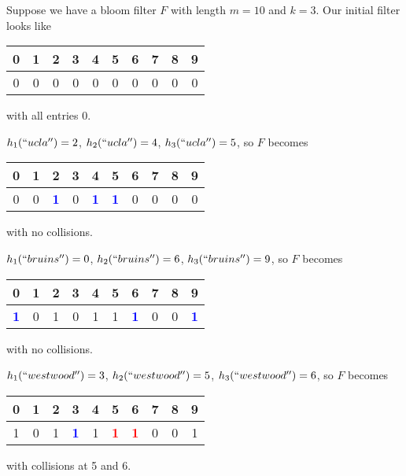 \documentclass{report}
\newenvironment{example}{\begin{tcolorbox}[title={Example},colback=green!5!white,colframe=black!75!green]}{\end{tcolorbox}}
\renewcommand{\bf}[1]{\textbf{{#1}}}
\begin{document}
\begin{example}
    Suppose we have a bloom filter $F$ with length $m = 10$ and $k = 3$. Our
    initial filter looks like

    {
        \centering
        \begin{tabular}{cccccccccc}
            0 & 1 & 2 & 3 & 4 & 5 & 6 & 7 & 8 & 9 \\
            \hline
            0 & 0 & 0 & 0 & 0 & 0 & 0 & 0 & 0 & 0 \\
        \end{tabular}
        \par
        with all entries 0.
        \vspace{1em}
    }

    {
        $h_1(``ucla'') = 2$, $h_2(``ucla'') = 4$, $h_3(``ucla'') = 5$, so $F$
        becomes
        \centering
        \begin{tabular}{cccccccccc}
            0 & 1 & 2 & 3 & 4 & 5 & 6 & 7 & 8 & 9 \\
            \hline
            0 & 0 & \textcolor{blue}{\bf{1}} & 0 & \textcolor{blue}{\bf{1}} & \textcolor{blue}{\bf{1}} & 0 & 0 & 0 & 0 \\
        \end{tabular}
        \par
        with no collisions.
        \vspace{1em}
    }

    {
        $h_1(``bruins'') = 0$, $h_2(``bruins'') = 6$, $h_3(``bruins'') = 9$, so $F$
        becomes
        \centering
        \begin{tabular}{cccccccccc}
            0 & 1 & 2 & 3 & 4 & 5 & 6 & 7 & 8 & 9 \\
            \hline
            \textcolor{blue}{\bf{1}} & 0 & 1 & 0 & 1 & 1 & \textcolor{blue}{\bf{1}} & 0 & 0 & \textcolor{blue}{\bf{1}} \\
        \end{tabular}
        \par
        with no collisions.
        \vspace{1em}
    }

    {
        $h_1(``westwood'') = 3$, $h_2(``westwood'') = 5$, $h_3(``westwood'') = 6$, so $F$
        becomes
        \centering
        \begin{tabular}{cccccccccc}
            0 & 1 & 2 & 3 & 4 & 5 & 6 & 7 & 8 & 9 \\
            \hline
            1 & 0 & 1 & \textcolor{blue}{\bf{1}} & 1 & \textcolor{red}{\bf{1}} & \textcolor{red}{\bf{1}} & 0 & 0 & 1 \\
        \end{tabular}
        \par
        with collisions at 5 and 6.
        \vspace{1em}
    }


\end{example}
\end{document}
